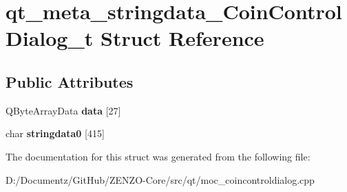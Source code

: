 \hypertarget{structqt__meta__stringdata___coin_control_dialog__t}{}\section{qt\+\_\+meta\+\_\+stringdata\+\_\+\+Coin\+Control\+Dialog\+\_\+t Struct Reference}
\label{structqt__meta__stringdata___coin_control_dialog__t}
\subsection*{Public Attributes}
\begin{DoxyCompactItemize}
\item 
\mbox{\label{structqt__meta__stringdata___coin_control_dialog__t_a970af21467ee05e8fc7bc8620d3ccd2f}} 
Q\+Byte\+Array\+Data {\bfseries data} \mbox{[}27\mbox{]}
\item 
\mbox{\label{structqt__meta__stringdata___coin_control_dialog__t_aa4adc503177dcef1df35c212bfb6e183}} 
char {\bfseries stringdata0} \mbox{[}415\mbox{]}
\end{DoxyCompactItemize}


The documentation for this struct was generated from the following file\+:\begin{DoxyCompactItemize}
\item 
D\+:/\+Documentz/\+Git\+Hub/\+Z\+E\+N\+Z\+O-\/\+Core/src/qt/moc\+\_\+coincontroldialog.\+cpp\end{DoxyCompactItemize}
